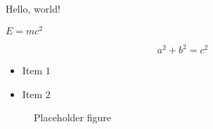 \documentclass{article}
\begin{document}
Hello, world!

$E=mc^2$

\begin{equation}
    a^2 + b^2 = c^2
\end{equation}

\begin{itemize}
    \item Item 1
    \item Item 2
\end{itemize}

\begin{figure}[h]
    \centering
    \caption{Placeholder figure}
    \label{fig:placeholder}
\end{figure}
\end{document}
